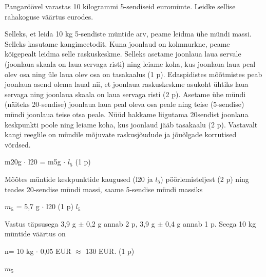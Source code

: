 
Pangaröövel varastas 10 kilogrammi 5-sendiseid euromünte. Leidke sellise rahakoguse väärtus eurodes.

\hint

\solu
Selleks, et leida 10 kg 5-sendiste müntide arv, peame leidma ühe mündi massi. Selleks kasutame kangimeetodit. Kuna joonlaud on kolmnurkne, peame kõigepealt leidma selle raskuskeskme. Selleks asetame joonlaua laua servale (joonlaua skaala on laua servaga risti) ning leiame koha, kus joonlaua laua peal olev osa ning üle laua olev osa on tasakaalus (1 p). Edaspidistes mõõtmistes peab joonlaua asend olema laual nii, et joonlaua raskuskeskme asukoht ühtiks laua servaga ning joonlaua skaala on laua servaga risti (2 p). Asetame ühe mündi (näiteks 20-sendise) joonlaua laua peal oleva osa peale ning teise (5-sendise) mündi joonlaua teise otsa peale. Nüüd hakkame liigutama 20sendist joonlaua keskpunkti poole ning leiame koha, kus joonlaud jääb tasakaalu (2 p). Vastavalt kangi reeglile on mündile mõjuvate raskusjõudude ja jõuõlgade korrutised võrdsed.

m20g $\cdot$ l20 = m5g $\cdot$ $l_5$ (1 p)

Mõõtes müntide keskpunktide kaugused (l20 ja $l_5$) pöörlemisteljest (2 p) ning teades 20-sendise mündi massi, saame 5-sendise mündi massiks

$m_5$ = 5,7 g $\cdot$ l20 (1 p) $l_5$

Vastus täpsusega 3,9 g $\pm$ 0,2 g annab 2 p, 3,9 g $\pm$ 0,4 g annab 1 p. Seega 10 kg müntide väärtus on

n= 10 kg $\cdot$ 0,05 EUR $\approx$ 130 EUR. (1 p)

$m_5$
\probend
